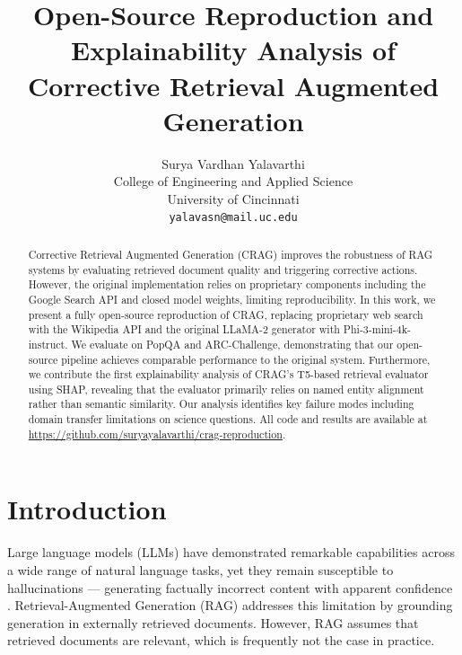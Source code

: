\documentclass[11pt]{article}
\title{\textbf{Open-Source Reproduction and Explainability Analysis of\\Corrective Retrieval Augmented Generation}}
\author{
  Surya Vardhan Yalavarthi \\
  College of Engineering and Applied Science \\
  University of Cincinnati \\
  \texttt{yalavasn@mail.uc.edu}
}
\date{}
\begin{document}
\raggedbottom
\setcounter{topnumber}{1}       %
\setcounter{dbltopnumber}{1}    %
\renewcommand{\topfraction}{0.85}
\renewcommand{\floatpagefraction}{0.7}

\maketitle

\begin{abstract}
Corrective Retrieval Augmented Generation (CRAG) improves the robustness of RAG systems by
evaluating retrieved document quality and triggering corrective actions. However, the original
implementation relies on proprietary components including the Google Search API and closed model
weights, limiting reproducibility. In this work, we present a fully open-source reproduction of
CRAG, replacing proprietary web search with the Wikipedia API and the original LLaMA-2 generator
with Phi-3-mini-4k-instruct. We evaluate on PopQA and ARC-Challenge, demonstrating that our
open-source pipeline achieves comparable performance to the original system. Furthermore, we
contribute the first explainability analysis of CRAG's T5-based retrieval evaluator using SHAP,
revealing that the evaluator primarily relies on named entity alignment rather than semantic
similarity. Our analysis identifies key failure modes including domain transfer limitations on
science questions. All code and results are available at
\url{https://github.com/suryayalavarthi/crag-reproduction}.
\end{abstract}

\section{Introduction}

Large language models (LLMs) have demonstrated remarkable capabilities across a wide range of
natural language tasks, yet they remain susceptible to hallucinations --- generating factually
incorrect content with apparent confidence \cite{zhang2023siren}. Retrieval-Augmented Generation
(RAG) \cite{lewis2020retrieval} addresses this limitation by grounding generation in externally
retrieved documents. However, RAG assumes that retrieved documents are relevant, which is
frequently not the case in practice.
\end{document}
